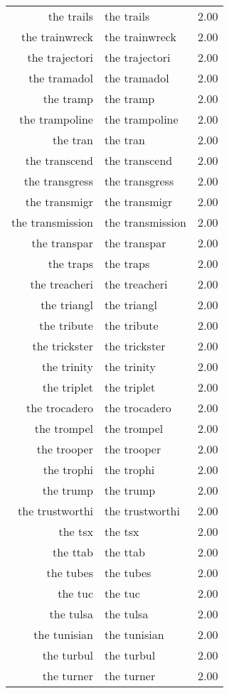 \begin{table}[ht]
\begin{tabular}{rlr}
  the trails & the trails & 2.00 \\ 
  the trainwreck & the trainwreck & 2.00 \\ 
  the trajectori & the trajectori & 2.00 \\ 
  the tramadol & the tramadol & 2.00 \\ 
  the tramp & the tramp & 2.00 \\ 
  the trampoline & the trampoline & 2.00 \\ 
  the tran & the tran & 2.00 \\ 
  the transcend & the transcend & 2.00 \\ 
  the transgress & the transgress & 2.00 \\ 
  the transmigr & the transmigr & 2.00 \\ 
  the transmission & the transmission & 2.00 \\ 
  the transpar & the transpar & 2.00 \\ 
  the traps & the traps & 2.00 \\ 
  the treacheri & the treacheri & 2.00 \\ 
  the triangl & the triangl & 2.00 \\ 
  the tribute & the tribute & 2.00 \\ 
  the trickster & the trickster & 2.00 \\ 
  the trinity & the trinity & 2.00 \\ 
  the triplet & the triplet & 2.00 \\ 
  the trocadero & the trocadero & 2.00 \\ 
  the trompel & the trompel & 2.00 \\ 
  the trooper & the trooper & 2.00 \\ 
  the trophi & the trophi & 2.00 \\ 
  the trump & the trump & 2.00 \\ 
  the trustworthi & the trustworthi & 2.00 \\ 
  the tsx & the tsx & 2.00 \\ 
  the ttab & the ttab & 2.00 \\ 
  the tubes & the tubes & 2.00 \\ 
  the tuc & the tuc & 2.00 \\ 
  the tulsa & the tulsa & 2.00 \\ 
  the tunisian & the tunisian & 2.00 \\ 
  the turbul & the turbul & 2.00 \\ 
  the turner & the turner & 2.00 \\ 

\end{tabular}
\end{table}
